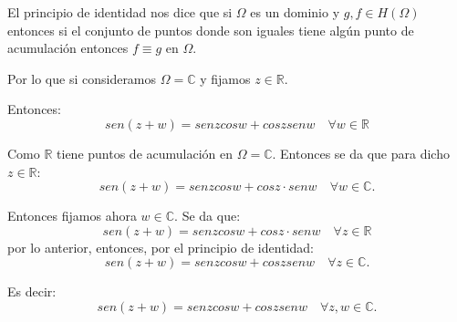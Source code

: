 {
    El principio de identidad nos dice que si $\Omega$ es un dominio y $g, f \in H(\Omega)$ entonces si el conjunto de puntos donde son iguales tiene algún punto de acumulación entonces $f \equiv g$ en $\Omega$.

Por lo que si consideramos $\Omega = \mathbb{C}$ y fijamos $z \in \mathbb{R}$.

Entonces:
\[sen(z+w) = sen z cos w + cos z sen w \quad \forall w \in \mathbb{R} \]

Como $\mathbb{R}$ tiene puntos de acumulación en $\Omega = \mathbb{C}$. Entonces se da que para dicho $z \in \mathbb{R}$:
\[ sen(z+w) = sen z cos w + cos z \cdot sen w \quad \forall w \in \mathbb{C}. \]

Entonces fijamos ahora $w \in \mathbb{C}$. Se da que:
\[ sen(z+w) = sen z cos w + cos z \cdot sen w \quad \forall z \in \mathbb{R} \]
por lo anterior, entonces, por el principio de identidad:
\[ sen(z+w) = sen z cos w + cos z sen w \quad \forall z \in \mathbb{C}. \]

Es decir:
\[sen(z+w) = sen z cos w + cos z sen w \quad \forall z, w \in \mathbb{C}. \]
}
